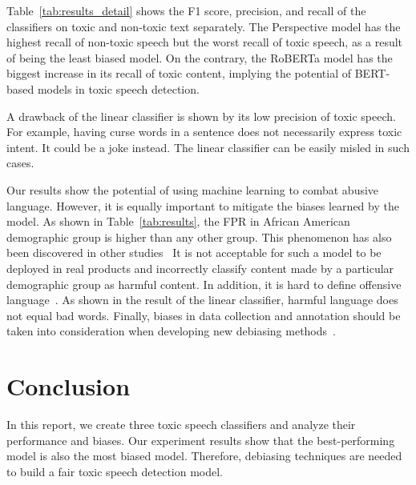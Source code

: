 \documentclass[11pt]{article}
\begin{document}
    Table~\ref{tab:results_detail} shows the F1 score, precision, and recall of the classifiers on
    toxic and non-toxic text separately.
    The Perspective model has the highest recall of non-toxic speech but the worst recall of toxic speech, as
    a result of being the least biased model.
    On the contrary, the RoBERTa model has the biggest increase in its recall of toxic content,
    implying the potential of BERT-based models in toxic speech detection.

    A drawback of the linear classifier is shown by its low precision of toxic speech.
    For example, having curse words in a sentence does not necessarily express toxic intent.
    It could be a joke instead.
    The linear classifier can be easily misled in such cases.

    Our results show the potential of using machine learning to combat abusive language.
    However, it is equally important to mitigate the biases learned by the model.
    As shown in Table~\ref{tab:results}, the FPR in African American demographic group is higher than any other group.
    This phenomenon has also been discovered in other studies~\cite{xuhuizhou2021}
    It is not acceptable for such a model to be deployed in real products and incorrectly classify content
    made by a particular demographic group as harmful content.
    In addition, it is hard to define offensive language~\cite{fortuna2022}.
    As shown in the result of the linear classifier, harmful language does not equal bad words.
    Finally, biases in data collection and annotation should be taken into consideration when developing new debiasing
    methods~\cite{clark2019}.


    \section{Conclusion}

    In this report, we create three toxic speech classifiers and analyze their performance and biases.
    Our experiment results show that the best-performing model is also the most biased model.
    Therefore, debiasing techniques are needed to build a fair toxic speech detection model.

    \clearpage
    
    



\end{document}
